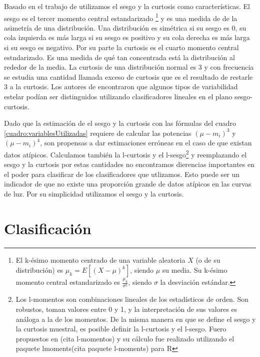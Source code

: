 \documentclass[letterpaper,12pt]{book}
\begin{document}
Basado en el trabajo de \cite{rodriguez_feliciano_alisis_2012} utilizamos el sesgo y la curtosis como características. El sesgo es el tercer momento central estandarizado \footnote{El k-ésimo momento centrado de una variable aleatoria $X$ (o de su distribución) es $\mu_{k} =E[(X-\mu)^{k}]$, siendo $\mu$ su media. Su k-ésimo momento central estandarizado es $\frac{\mu_k}{\sigma^k}$, siendo $\sigma$ la desviación estándar.} y es una medida de de la asimetría de una distribución. Una distribución es simétrica si su sesgo es $0$, su cola izquierda es más larga si su sesgo es positivo y su cola derecha es más larga si su sesgo es negativo. Por su parte la curtosis es el cuarto momento central estndarizado. Es una medida de qué tan concentrada está la distribución al rededor de la media. La curtosis de una distribución normal es $3$ y con frecuencia se estudia una cantidad llamada exceso de curtosis que es el resultado de restarle $3$ a la curtosis. Los autores de \cite{rodriguez_feliciano_alisis_2012}  encontraron que algunos tipos de variabilidad estelar podían ser distinguidos utilizando clasificadores lineales en el plano sesgo-curtosis.

Dado que la estimación de el sesgo y la curtosis con las fórmulas del cuadro \ref{cuadro:variablesUtilizadas} requiere de calcular las potencias $(\mu-m_i)^3$ y $(\mu-m_i)^4$, son propensas a dar estimaciones erróneas en el caso de que existan datos atípicos. Calculamos también la l-curtosis y el l-sesgo\footnote{Los l-momentos son combinaciones lineales de los estadísticos de orden. Son robustos, toman valores entre 0 y 1, y la interpretación de sus valores es análoga a la de los momentos. De la misma manera en que se define el sesgo y la curtosis muestral, es posible definir la l-curtosis y el l-sesgo. Fuero propuestos en (cita l-momentos) y su cálculo fue realizado utilizando el paquete lmoments(cita paquete l-moments) para R} y reemplazando el sesgo y la curtosis por estas cantidades no encontramos dierencias importantes en el poder para clasificar de los clasificadores que utlizamos. Esto puede ser un indicador de que no existe una proporción grande de datos atípicos en las curvas de luz. Por su simplicidad utilizamos el sesgo y la curtosis.  


\section{Clasificación}
\end{document}
